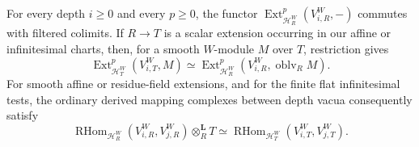 \begin{lemma}\label{walg:ext}
For every depth \(i\geq0\) and every \(p\geq0\), the functor
\(\operatorname{Ext}^p_{\mathcal H_R^W}(V_{i,R}^W,-)\) commutes
with filtered colimits.  If \(R\to T\) is a scalar extension occurring
in our affine or infinitesimal charts, then, for a smooth \(W\)-module
\(M\) over \(T\), restriction gives
\begin{equation}\label{walg:restriction-ext}
 \operatorname{Ext}^p_{\mathcal H_T^W}(V_{i,T}^W,M)
 \simeq
 \operatorname{Ext}^p_{\mathcal H_R^W}
             (V_{i,R}^W,\operatorname{oblv}_R M).
\end{equation}
For smooth affine or residue-field extensions, and for the finite
flat infinitesimal tests, the ordinary derived mapping complexes
between depth vacua consequently satisfy
\begin{equation}\label{walg:mapping-base-change}
 \operatorname{RHom}_{\mathcal H_R^W}(V_{i,R}^W,V_{j,R}^W)
       \otimes_R^{\mathbf L} T
 \simeq
 \operatorname{RHom}_{\mathcal H_T^W}(V_{i,T}^W,V_{j,T}^W).
\end{equation}
\end{lemma}

